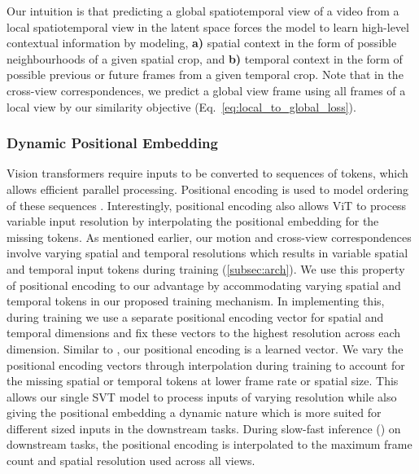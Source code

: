 \documentclass[10pt,twocolumn,letterpaper]{article}
\begin{document}
Our intuition is that predicting a global spatiotemporal view of a video from a local spatiotemporal view in the latent space forces the model to learn high-level contextual information by modeling, \textbf{a)} spatial context in the form of possible neighbourhoods of a given spatial crop, and \textbf{b)} temporal context in the form of possible previous or future frames from a given temporal crop. Note that in the cross-view correspondences, we predict a global view frame using all frames of a local view by our similarity objective (Eq.~\ref{eq:local_to_global_loss}). 



\vspace{-0.7em}
\subsubsection{Dynamic Positional Embedding}
\vspace{-0.5em}
\label{subsec:dynamic_positional_embedding}
Vision transformers \cite{dosovitskiy2020image} require inputs to be converted to sequences of tokens, which allows efficient parallel processing. Positional encoding is used to model ordering of these sequences \cite{naseer2021intriguing}. Interestingly, positional encoding also allows ViT to process variable input resolution by interpolating the positional embedding for the missing tokens. As mentioned earlier, our motion and cross-view correspondences involve varying spatial and temporal resolutions which results in variable spatial and temporal input tokens during training (\cref{subsec:arch}). We use this property of positional encoding to our advantage by accommodating varying spatial and temporal tokens in our proposed training mechanism. 
In implementing this, during training we use a separate positional encoding vector for spatial and temporal dimensions and fix these vectors to the highest resolution across each dimension. Similar to \cite{dosovitskiy2020image}, our positional encoding is a learned vector. We vary the positional encoding vectors through interpolation during training to account for the missing spatial or temporal tokens at lower frame rate or spatial size. This allows our single SVT model to process inputs of varying resolution while also giving the positional embedding a dynamic nature which is more suited for different sized inputs in the downstream tasks. During slow-fast inference () on downstream tasks, the positional encoding is interpolated to the maximum frame count and spatial resolution used across all views. 
\end{document}
